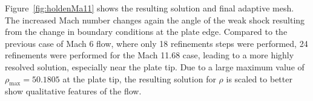 Figure~\ref{fig:holdenMa11} shows the resulting solution and final adaptive mesh.  The increased Mach number changes again the angle of the weak shock resulting from the change in boundary conditions at the plate edge.  Compared to the previous case of Mach 6 flow, where only 18 refinements steps were performed, 24 refinements were performed for the Mach 11.68 case, leading to a more highly resolved solution, especially near the plate tip.  Due to a large maximum value of $\rho_{\max} = 50.1805$ at the plate tip, the resulting solution for $\rho$ is scaled to better show qualitative features of the flow.  

%

